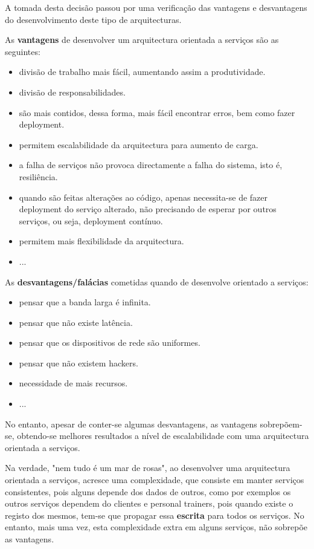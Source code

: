 \hspace{5mm} A tomada desta decisão passou por uma verificação das vantagens e desvantagens do desenvolvimento deste tipo de arquitecturas.

\hspace{5mm} As \textbf{vantagens} de desenvolver um arquitectura orientada a serviços são as seguintes:
\begin{itemize}
    \item divisão de trabalho mais fácil, aumentando assim a produtividade.
    \item divisão de responsabilidades.
    \item são mais contidos, dessa forma, mais fácil encontrar erros, bem como fazer deployment.
    \item permitem escalabilidade da arquitectura para aumento de carga.
    \item a falha de serviços não provoca directamente a falha do sistema, isto é, resiliência.
    \item quando são feitas alterações ao código, apenas necessita-se de fazer deployment do serviço alterado, não precisando de esperar por outros serviços, ou seja, deployment contínuo.
    \item permitem mais flexibilidade da arquitectura.
    \item ...
\end{itemize}

\hspace{5mm} As \textbf{desvantagens/falácias} cometidas quando de desenvolve orientado a serviços:
\begin{itemize}
    \item pensar que a banda larga é infinita.
    \item pensar que não existe latência.
    \item pensar que os dispositivos de rede são uniformes.
    \item pensar que não existem hackers.
    \item necessidade de mais recursos.
    \item ...
\end{itemize}

\hspace{5mm} No entanto, apesar de conter-se algumas desvantagens, as vantagens sobrepõem-se, obtendo-se melhores resultados a nível de escalabilidade com uma arquitectura orientada a serviços.

\hspace{5mm} Na verdade, "nem tudo é um mar de rosas", ao desenvolver uma arquitectura orientada a serviços, acresce uma complexidade, que consiste em manter serviços consistentes, pois alguns depende dos dados de outros, como por exemplos os outros serviços dependem do clientes e personal trainers, pois quando existe o registo dos mesmos, tem-se que propagar essa \textbf{escrita} para todos os serviços. No entanto, mais uma vez, esta complexidade extra em alguns serviços, não sobrepõe as vantagens.

